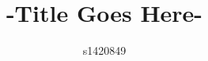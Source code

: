 \documentclass[12pt]{article}
\title{-Title Goes Here-}
\author{\normalsize{s1420849}}
\begin{document}
\maketitle

% 

\nocite{*}


\end{document}
